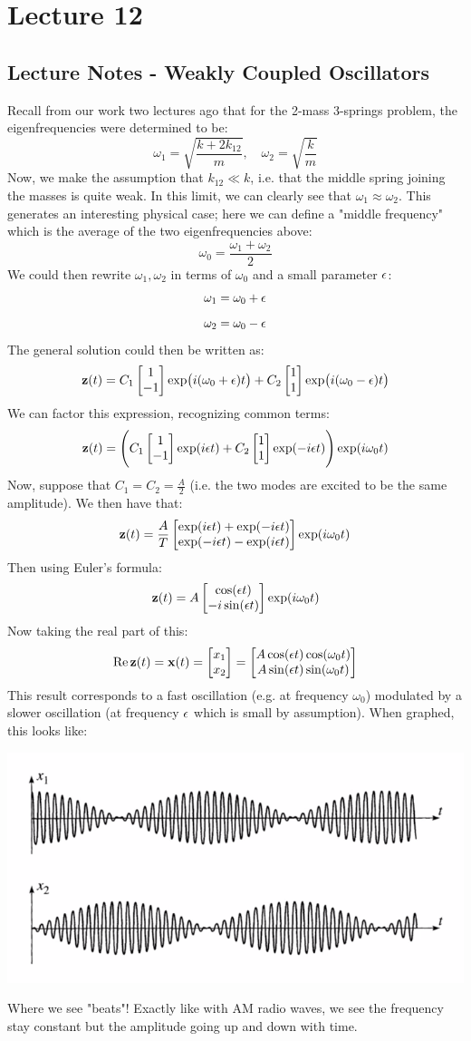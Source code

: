 \section{Lecture 12}
\subsection{Lecture Notes - Weakly Coupled Oscillators}
Recall from our work two lectures ago that for the 2-mass 3-springs problem, the eigenfrequencies were determined to be:
\[\omega_1 = \sqrt{\frac{k+2k_{12}}{m}}, \quad \omega_2 = \sqrt{\frac{k}{m}}\]
Now, we make the assumption that $k_{12} \ll k$, i.e. that the middle spring joining the masses is quite weak. In this limit, we can clearly see that $\omega_1 \approx \omega_2$. This generates an interesting physical case; here we can define a "middle frequency" which is the average of the two eigenfrequencies above:
\[\omega_0 = \frac{\omega_1 + \omega_2}{2}\]
We could then rewrite $\omega_1, \omega_2$ in terms of $\omega_0$ and a small parameter $\epsilon$:
\[\omega_1 = \omega_0 + \epsilon\]
\[\omega_2 = \omega_0 - \epsilon\]
The general solution could then be written as:
\[\mathbf{z}(t) = C_1\begin{bmatrix}1 \\ -1\end{bmatrix}\exp(i(\omega_0 + \epsilon)t) + C_2\begin{bmatrix}1\\1\end{bmatrix}\exp(i(\omega_0 - \epsilon)t)\]
We can factor this expression, recognizing common terms:
\[\mathbf{z}(t) = \left(C_1\begin{bmatrix}1 \\ -1\end{bmatrix}\exp(i\epsilon t) + C_2\begin{bmatrix}1\\1\end{bmatrix}\exp(-i\epsilon t)\right)\exp(i\omega_0 t)\]
Now, suppose that $C_1 = C_2 = \frac{A}{2}$ (i.e. the two modes are excited to be the same amplitude). We then have that:
\[\mathbf{z}(t) = \frac{A}{T}\begin{bmatrix}\exp(i\epsilon t) + \exp(-i\epsilon t) \\ \exp(-i\epsilon t) - \exp(i \epsilon t)\end{bmatrix}\exp(i\omega_0 t)\]
Then using Euler's formula:
\[\mathbf{z}(t) = A\begin{bmatrix}\cos(\epsilon t) \\ -i\sin(\epsilon t)\end{bmatrix}\exp(i\omega_0 t)\]
Now taking the real part of this:
\[\Re\mathbf{z}(t) = \mathbf{x}(t) = \begin{bmatrix}x_1 \\ x_2\end{bmatrix} = \begin{bmatrix}A\cos(\epsilon t)\cos(\omega_0 t) \\ A\sin(\epsilon t)\sin(\omega_0 t)\end{bmatrix}\]
This result corresponds to a fast oscillation (e.g. at frequency $\omega_0$) modulated by a slower oscillation (at frequency $\epsilon$ which is small by assumption). When graphed, this looks like:
\begin{center}
    \includegraphics[scale=0.5]{Lecture-12/l12-img1.png}
\end{center}
Where we see "beats"! Exactly like with AM radio waves, we see the frequency stay constant but the amplitude going up and down with time.